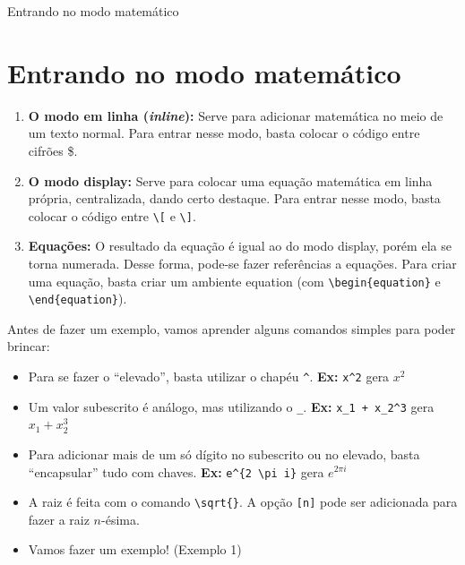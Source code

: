 \documentclass[12pt]{beamer}
\begin{document}
\begin{frame}[fragile]{Entrando no modo matemático}
  \section{Entrando no modo matemático}
  \begin{enumerate}
    \item \textbf{O modo em linha (\textit{inline}):} Serve para adicionar matemática no meio de um texto normal. Para entrar nesse modo, basta colocar o código entre cifrões \$.

    \item \textbf{O modo display:} Serve para colocar uma equação matemática em linha própria, centralizada, dando certo destaque. Para entrar nesse modo, basta colocar o código entre \verb+\[+ e \verb+\]+.

    \item \textbf{Equações:} O resultado da equação é igual ao do modo display, porém ela se torna numerada. Desse forma, pode-se fazer referências a equações. Para criar uma equação, basta criar um ambiente equation (com \verb+\begin{equation}+ e \verb+\end{equation}+).

  \end{enumerate}
\end{frame}

\begin{frame}[fragile]
  Antes de fazer um exemplo, vamos aprender alguns comandos simples para poder brincar:
  \begin{itemize}
    \item Para se fazer o ``elevado'', basta utilizar o chapéu \verb+^+. \textbf{Ex:} \verb+x^2+ gera $x^2$
    \item Um valor subescrito é análogo, mas utilizando o \verb+_+. \textbf{Ex:} \verb-x_1 + x_2^3- gera $x_1 + x_2^3$
    \item Para adicionar mais de um só dígito no subescrito ou no elevado, basta ``encapsular'' tudo com chaves. \textbf{Ex:} \verb-e^{2 \pi i}- gera $e^{2 \pi i}$
  \end{itemize}
\end{frame}

\begin{frame}[fragile]
  \begin{itemize}
    \item A raiz é feita com o comando \verb+\sqrt{}+. A opção \verb+[n]+ pode ser adicionada para fazer a raiz $n$-ésima.
    \item Vamos fazer um exemplo! (Exemplo 1)
  \end{itemize}
\end{frame}
\end{document}
